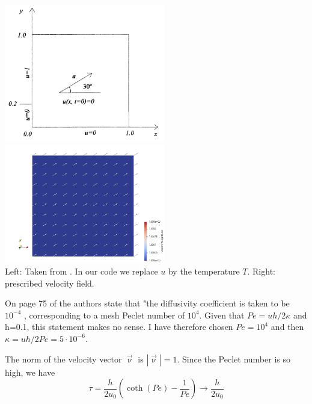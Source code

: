 \begin{center}
\includegraphics[width=7cm]{python_codes/fieldstone_65/images/setup}
\includegraphics[width=7cm]{python_codes/fieldstone_65/results/exp2/vel}\\
{\captionfont Left: Taken from \cite{dohu03}. In our code we replace $u$ by the 
temperature $T$. Right: prescribed velocity field.}
\end{center}

\begin{remark}
On page 75 of \cite{dohu03} the authors state that 
"the diffusivity coefficient is taken to be $10^{-4}$ , 
corresponding to a mesh Peclet number of $10^4$. 
Given that $Pe=u h/2\kappa$ and h=0.1, this statement makes no sense.
I have therefore chosen $Pe=10^4$ and then 
$\kappa=uh/2Pe = 5\cdot10^{-6}$.
\end{remark}

The norm of the velocity vector $\vec{\upnu}$ is $|\vec{\upnu}|=1$. 
Since the Peclet number is so high, we have 
\[
\tau = \frac{h}{2 u_0} \left( \coth (Pe) -\frac{1}{Pe} \right) \rightarrow 
\frac{h}{2 u_0} 
\]


